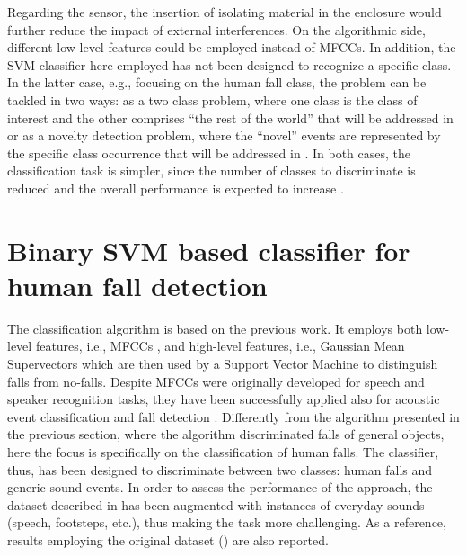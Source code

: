 Regarding the sensor, the insertion of isolating material in the enclosure would further reduce the impact of external interferences. On the algorithmic side, different low-level features could be employed instead of MFCCs. 
 In addition, the SVM classifier here employed has not been designed to recognize a specific class. In the latter case, e.g., focusing on the human fall class, the problem can be tackled in two ways: as a two class problem, where one class is the class of interest and the other comprises ``the rest of the world'' that will be addressed in  or as a novelty detection problem, where the ``novel'' events are represented by the specific class occurrence that will be addressed in . In both cases, the classification task is simpler, since the number of classes to discriminate is reduced and the overall performance is expected to increase \cite{bishop06}.

\section{Binary SVM based classifier for human fall detection}
\label{sec:biclass_svm}

The classification algorithm is based on the previous work. It employs both low-level features, i.e., MFCCs \cite{Davis80}, and high-level features, i.e., Gaussian Mean Supervectors which are then used by a Support Vector Machine to distinguish falls from no-falls. Despite MFCCs were originally developed for speech and speaker recognition tasks, they have been successfully applied also for acoustic event classification \cite{Temko06} and fall detection \cite{zigel2009method}. Differently from the algorithm presented in the previous section, where the algorithm discriminated falls of general objects, here the focus is specifically on the classification of human falls. The classifier, thus, has been designed to discriminate between two classes: human falls and generic sound events. In order to assess the performance of the approach, the dataset described in  has been augmented with instances of everyday sounds (speech, footsteps, etc.), thus making the task more challenging. As a reference, results employing the original dataset () are also reported.

